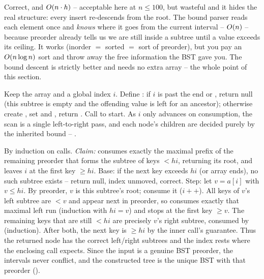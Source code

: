 \begin{thinkbox}
{Correct, and $O(n\cdot h)$ -- acceptable here at $n\le100$, but wasteful and it hides the real
structure: every insert re-descends from the root. The bound parser reads each element once and
\emph{knows} where it goes from the current interval -- $O(n)$ -- because preorder already tells us
we are still inside a subtree until a value exceeds its ceiling.}
{It works (inorder $=$ sorted $=$ sort of preorder), but you pay an $O(n\log n)$ sort and throw
away the free information the BST gave you. The bound descent is strictly better and needs no extra
array -- the whole point of this section.}
\end{thinkbox}

Keep the array and a global index $i$. Define : if $i$ is past the end or
, return null (this subtree is empty and the offending value is left for an ancestor);
otherwise create , set  and
, return . Call  to start. As $i$ only
advances on consumption, the scan is a single left-to-right pass, and each node's children are decided
purely by the inherited bound -- .

\begin{proofbox}
By induction on  calls. \emph{Claim:}  consumes exactly the maximal
prefix of the remaining preorder that forms the subtree of keys $<\mathit{hi}$, returning its root,
and leaves $i$ at the first key $\ge\mathit{hi}$. Base: if the next key exceeds $\mathit{hi}$ (or
array ends), no such subtree exists -- return null, index unmoved, correct. Step: let $v=a[i]$ with
$v\le\mathit{hi}$. By preorder, $v$ is this subtree's root; consume it ($i{+}{+}$). All keys of $v$'s
left subtree are $<v$ and appear next in preorder, so  consumes exactly that maximal
left run (induction with $\mathit{hi}=v$) and stops at the first key $\ge v$. The remaining keys that
are still $<\mathit{hi}$ are precisely $v$'s right subtree, consumed by  (induction).
After both, the next key is $\ge\mathit{hi}$ by the inner call's guarantee. Thus the returned node has
the correct left/right subtrees and the index rests where the enclosing call expects. Since the input
is a genuine BST preorder, the intervals never conflict, and the constructed tree is the unique BST
with that preorder (). \end{proofbox}

